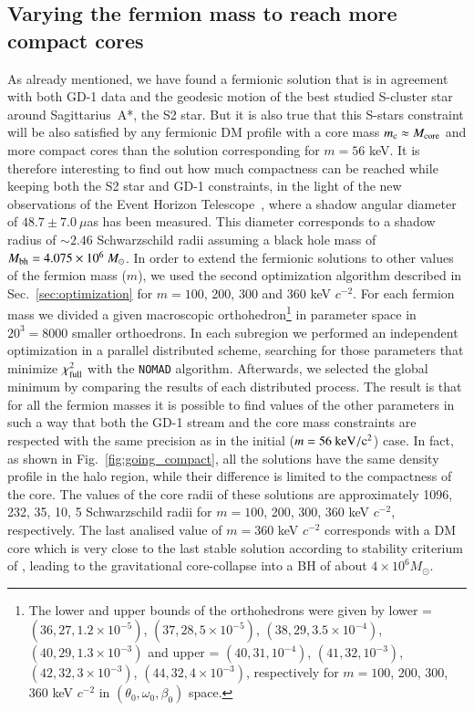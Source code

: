 \documentclass[twocolumn]{aa}
\begin{document}
\subsection{Varying the fermion mass to reach more compact cores}
As already mentioned, we have found a fermionic solution that is in agreement with both GD-1 data and
the geodesic motion of the best studied S-cluster star around Sagittarius~A*, the S2 star. But it is also true that this S-stars constraint will be also satisfied by any fermionic DM profile
with a core mass $m_\mathrm{c}\approx M_{\rm{core}}$ and more compact cores than the solution corresponding for $m=56$ keV. It is therefore interesting to find out how much compactness can be reached
while keeping both the S2 star and \hbox{GD-1} constraints, in the light of the new observations
of the Event Horizon Telescope~\citep{EHT_image}, where a shadow angular diameter of $48.7\pm7.0~\mu$as
has been measured. This diameter corresponds to a shadow radius of $\sim 2.46$ Schwarzschild radii assuming
a black hole mass of $M_{\rm{bh}}=4.075\times10^6~M_\odot$.
In order to extend the fermionic solutions to other values of the fermion mass ($m$), we used the second optimization algorithm described in Sec.~\ref{sec:optimization} for $m=100$, 200, 300 and 360 keV $c^{-2}$. For each fermion mass we divided a given macroscopic orthohedron\footnote{The lower and upper bounds of the orthohedrons were given by
lower = $(36, 27, 1.2\times10^{-5})$, $(37, 28, 5\times10^{-5})$, $(38, 29, 3.5\times10^{-4})$, $(40, 29, 1.3\times10^{-3})$ and
upper = $(40, 31, 10^{-4})$, $(41, 32, 10^{-3})$, $(42, 32, 3\times10^{-3})$, $(44, 32, 4\times10^{-3})$, respectively for $m=100$, 200, 300, 360 keV $c^{-2}$ in $(\theta_0, \omega_0, \beta_0)$ space.} 
in parameter space in $20^3=8000$ smaller orthoedrons. In each subregion we performed an independent optimization in a parallel distributed scheme, searching for those parameters that minimize $\chi^2_{\rm{full}}$ with the \texttt{NOMAD} algorithm. Afterwards, we selected the global minimum by comparing the results of each distributed process.
The result is that for all the fermion masses it is possible to find values of the other parameters in such a way that both the GD-1 stream and the core mass constraints  are respected with the same precision as in the initial ($m=56~\rm{keV}/c^2$) case. In fact, as shown in Fig.~\ref{fig:going_compact}, all the solutions have the same density profile in the halo region, while their difference is limited to the compactness of the core.
The values of the core radii of these solutions are approximately 1096, 232, 35, 10, 5 Schwarzschild radii for $m=100$, 200, 300, 360 keV $c^{-2}$, respectively. The last analised value of $m=360$ keV $c^{-2}$ corresponds with a DM core which is very close to the last stable solution according to stability criterium of \cite{2021MNRAS.502.4227A}, leading to the gravitational core-collapse into a BH of about $4\times 10^6 M_\odot$.
\end{document}
